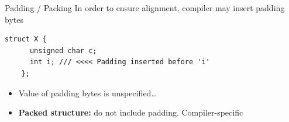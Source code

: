 \begin{frame}[fragile]{Padding / Packing}
  In order to ensure alignment, compiler may insert padding bytes
  \begin{lstlisting}[style=c++]
    struct X {
      unsigned char c;
      int i; /// <<<< Padding inserted before 'i'
    };
  \end{lstlisting}

  \vfill
  \begin{itemize}
    \itemsep=1ex
  \item Value of padding bytes is unspecified\ldots

  \item {\bfseries Packed structure:} do not include padding. \alert{Compiler-specific} ~~\NotOK
  \end{itemize}
\end{frame}
